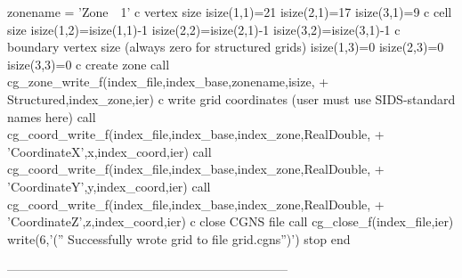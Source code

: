 \documentclass[12pt]{article}
\begin{document}
{\newline\indent      zonename = 'Zone~~1'
\newline c  vertex size
\newline\indent      isize(1,1)=21
\newline\indent      isize(2,1)=17
\newline\indent      isize(3,1)=9
\newline c  cell size
\newline\indent      isize(1,2)=isize(1,1)-1
\newline\indent      isize(2,2)=isize(2,1)-1
\newline\indent      isize(3,2)=isize(3,1)-1
\newline c  boundary vertex size (always zero for structured grids)
\newline\indent      isize(1,3)=0
\newline\indent      isize(2,3)=0
\newline\indent      isize(3,3)=0
\newline c  create zone
\newline\indent      call cg\_zone\_write\_f(index\_file,index\_base,zonename,isize,
\newline + \indent Structured,index\_zone,ier)
\newline c  write grid coordinates (user must use SIDS-standard names here)
\newline\indent      call cg\_coord\_write\_f(index\_file,index\_base,index\_zone,RealDouble,
\newline + \indent 'CoordinateX',x,index\_coord,ier)
\newline\indent      call cg\_coord\_write\_f(index\_file,index\_base,index\_zone,RealDouble,
\newline + \indent 'CoordinateY',y,index\_coord,ier)
\newline\indent      call cg\_coord\_write\_f(index\_file,index\_base,index\_zone,RealDouble,
\newline + \indent 'CoordinateZ',z,index\_coord,ier)
\newline c  close CGNS file
\newline\indent      call cg\_close\_f(index\_file,ier)
\newline\indent      write(6,'('' Successfully wrote grid to file grid.cgns'')')
\newline\indent      stop
\newline\indent      end
}

--------------------------------------------------------------------
\end{document}
